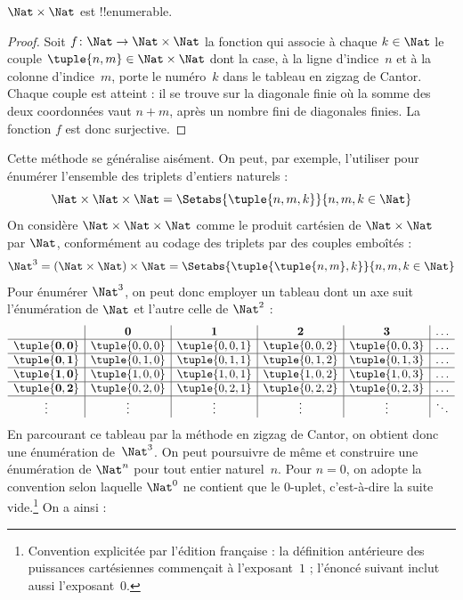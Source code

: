 \documentclass[11pt,a4paper,openany]{memoir}
\begin{document}
\begin{prop}
$\Nat \times \Nat$ est !!{enumerable}.
\end{prop}

\begin{proof}
Soit $f \colon \Nat \to \Nat\times\Nat$ la fonction qui associe
à chaque $k \in \Nat$ le couple $\tuple{n,m} \in \Nat \times \Nat$
dont la case, à la ligne d’indice~$n$ et à la colonne d’indice~$m$,
porte le numéro~$k$ dans le tableau en zigzag de Cantor.
Chaque couple est atteint : il se trouve sur la diagonale finie
où la somme des deux coordonnées vaut $n+m$, après un nombre fini
de diagonales finies. La fonction $f$ est donc surjective.
\end{proof}

\begin{explain}
Cette méthode se généralise aisément. On peut, par exemple,
l’utiliser pour énumérer l’ensemble des triplets d’entiers naturels :
\[
\Nat \times \Nat \times \Nat = \Setabs{\tuple{n,m,k}}{n,m,k \in \Nat}
\]
On considère $\Nat \times \Nat \times \Nat$ comme le produit
cartésien de $\Nat \times \Nat$ par $\Nat$, conformément au codage
des triplets par des couples emboîtés :
\[
\Nat^3 = (\Nat \times \Nat) \times \Nat =
\Setabs{\tuple{\tuple{n,m},k}}{n, m, k
  \in \Nat }
\]
Pour énumérer $\Nat^3$, on peut donc employer un tableau dont
un axe suit l’énumération de $\Nat$ et l’autre celle de $\Nat^2$ :
\[
\begin{array}{ c | c | c | c | c | c}
& \mathbf 0 & \mathbf 1 & \mathbf 2 & \mathbf 3 & \dots \\
\hline
\mathbf{\tuple{0,0}} & \tuple{0,0,0} & \tuple{0,0,1} & \tuple{0,0,2} & \tuple{0,0,3} & \dots \\
\hline
\mathbf{\tuple{0,1}} & \tuple{0,1,0} & \tuple{0,1,1} & \tuple{0,1,2} & \tuple{0,1,3} & \dots \\
\hline
\mathbf{\tuple{1,0}} & \tuple{1,0,0} & \tuple{1,0,1} & \tuple{1,0,2} & \tuple{1,0,3} & \dots \\
\hline
\mathbf{\tuple{0,2}} & \tuple{0,2,0} & \tuple{0,2,1} & \tuple{0,2,2} & \tuple{0,2,3} & \dots\\
\hline
\vdots & \vdots & \vdots & \vdots & \vdots & \ddots \\
\end{array}
\]
En parcourant ce tableau par la méthode en zigzag de Cantor,
on obtient donc une énumération de~$\Nat^3$. On peut poursuivre
de même et construire une énumération de $\Nat^n$ pour tout entier
naturel~$n$. Pour $n=0$, on adopte la convention selon laquelle
$\Nat^0$ ne contient que le $0$-uplet, c’est-à-dire la suite
vide.\footnote{Convention explicitée par l’édition française :
la définition antérieure des puissances cartésiennes commençait
à l’exposant~$1$ ; l’énoncé suivant inclut aussi l’exposant~$0$.}
On a ainsi :
\end{explain}
\end{document}
